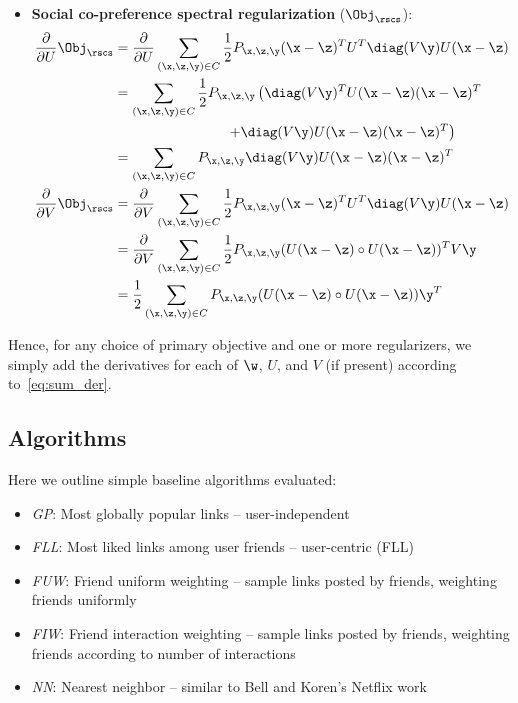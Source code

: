 \begin{itemize}
\item {\bf Social co-preference spectral regularization} ($\Obj_\rscs$):
\begin{align*}
\frac{\partial}{\partial U} \Obj_\rscs & = \frac{\partial}{\partial U} \sum_{(\x,\z,\y) \in C} \frac{1}{2} P_{\x,\z,\y} (\x - \z)^T U^T \diag(V\y) U (\x - \z)\\
& = \sum_{(\x,\z,\y) \in C} \frac{1}{2} P_{\x,\z,\y} \left( \diag(V\y)^T U (\x - \z) (\x - \z)^T \right.\\
& \left. \qquad \qquad \qquad \qquad + \diag(V\y) U (\x - \z) (\x - \z)^T \right)\\
& = \sum_{(\x,\z,\y) \in C} P_{\x,\z,\y} \diag(V\y) U (\x - \z) (\x - \z)^T\\
\frac{\partial}{\partial V} \Obj_\rscs & = \frac{\partial}{\partial V} \sum_{(\x,\z,\y) \in C} \frac{1}{2} P_{\x,\z,\y} (\x - \z)^T U^T \diag(V\y) U (\x - \z)\\
& = \frac{\partial}{\partial V} \sum_{(\x,\z,\y) \in C} \frac{1}{2} P_{\x,\z,\y} (U(\x-\z) \circ U(\x-\z))^T V\y\\
& = \frac{1}{2} \sum_{(\x,\z,\y) \in C} P_{\x,\z,\y} (U(\x-\z) \circ U(\x-\z)) \y^T
\end{align*}
\end{itemize}

Hence, for any choice of primary objective and one or more regularizers,
we simply add the derivatives for each of $\w$, $U$, and $V$ (if present) 
according to~\eqref{eq:sum_der}.

\subsection{Algorithms}

Here we outline simple baseline algorithms evaluated:
\begin{itemize}
\item {\it GP}: Most globally popular links -- user-independent
\item {\it FLL}: Most liked links among user friends -- user-centric (FLL) 
\item {\it FUW}: Friend uniform weighting -- sample links posted by friends, weighting friends uniformly
\item {\it FIW}: Friend interaction weighting -- sample links posted by friends, weighting friends according to number of interactions
\item {\it NN}: Nearest neighbor -- similar to Bell and Koren's Netflix work
\end{itemize}

